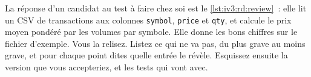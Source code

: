 \begin{question}\label{iq:iv3:reading-debugging-and-software-design:40}
La réponse d'un candidat au test à faire chez soi est le \cref{lst:iv3:rd:review}~: elle lit un CSV de transactions aux colonnes \texttt{symbol}, \texttt{price} et \texttt{qty}, et calcule le prix moyen pondéré par les volumes par symbole. Elle donne les bons chiffres sur le fichier d'exemple. Vous la relisez. Listez ce qui ne va pas, du plus grave au moins grave, et pour chaque point dites quelle entrée le révèle. Esquissez ensuite la version que vous accepteriez, et les tests qui vont avec.
\label{lst:iv3:rd:review}
\end{question}
